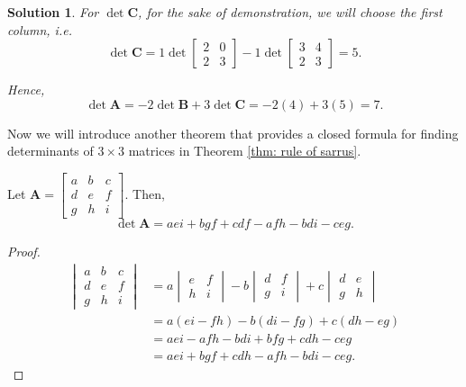 \documentclass[]{book}
\newcommand{\mat}[1]{\ensuremath{\mathbf{#1}}}
\newtheorem*{solution}{Solution}
\begin{document}
\begin{example}
\begin{solution}
    For $\det\mat{C}$, for the sake of demonstration, we will choose the first column, i.e.
    \[\det\mat{C} = 1 \det\begin{bmatrix}2 & 0 \\ 2 & 3\end{bmatrix} - 1 \det\begin{bmatrix}3 & 4 \\ 2 & 3\end{bmatrix} = 5.\]
    
    Hence,
    \[\det\mat{A} = -2\det\mat{B} +3\det\mat{C} = -2(4) + 3(5) = 7.\]
    \hfill \qedsymbol
\end{solution}
\end{example}

Now we will introduce another theorem that provides a closed formula for finding determinants of $3 \times 3$ matrices in Theorem \ref{thm: rule of sarrus}.

\begin{theorem}
    \label{thm: rule of sarrus}
    Let $\mat{A} = \begin{bmatrix} a & b & c \\ d & e & f \\ g & h & i \end{bmatrix}$. Then, \[\det\mat{A} = aei + bgf + cdf - afh - bdi - ceg.\]
\begin{proof}
    \begin{align*}
        \begin{vmatrix} a & b & c \\ d & e & f \\ g & h & i \end{vmatrix} &= a\begin{vmatrix}e & f \\ h & i \end{vmatrix} - b\begin{vmatrix}d & f \\ g & i\end{vmatrix} + c\begin{vmatrix} d & e \\ g & h \end{vmatrix} \\
        &= a(ei - fh) - b(di - fg) + c(dh - eg) \\
        &= aei - afh - bdi + bfg + cdh - ceg \\
        &= aei + bgf + cdh - afh - bdi - ceg.
    \end{align*}
\end{proof}
\end{theorem}
\end{document}

